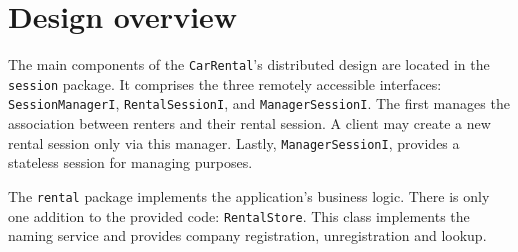 \section{Design overview}
The main components of the \texttt{CarRental}'s distributed design are located in the \texttt{session} package. It comprises the three remotely accessible interfaces: \texttt{SessionManagerI}, \texttt{RentalSessionI}, and \texttt{ManagerSessionI}. The first manages the association between renters and their rental session. A client may create a new rental session only via this manager. Lastly, \texttt{ManagerSessionI}, provides a stateless session for managing purposes. 

The \texttt{rental} package implements the application's business logic. There is only one addition to the provided code: \texttt{RentalStore}. This class implements the naming service and provides company registration, unregistration and lookup.